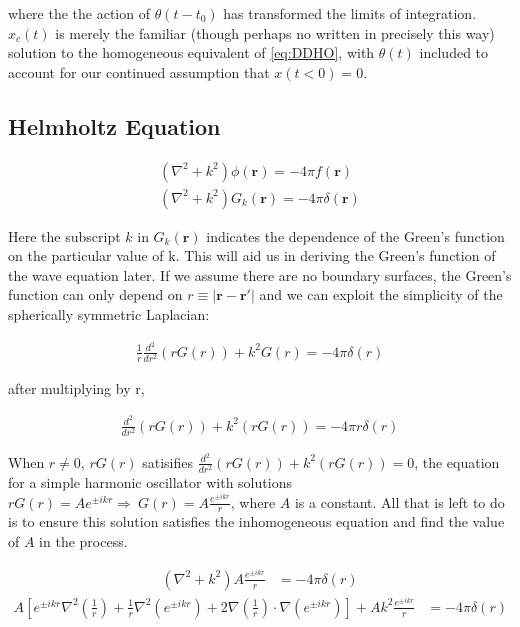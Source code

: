 \documentclass[11pt]{article}
\theoremstyle{plain}
\theoremstyle{definition}
\renewcommand{\vec}[1]{\mathbf{#1}} %
\begin{document}
where the the action of $\theta(t-t_0)$ has transformed the limits of integration. $x_c(t)$ is merely the familiar (though perhaps no written in precisely this way) solution to the homogeneous equivalent of \eqref{eq:DDHO}, with $\theta(t)$ included to account for our continued assumption that $x(t<0) = 0$.



\subsection{Helmholtz Equation}

\begin{align}
\left( \nabla^2+k^2 \right)\phi(\vec r) = -4\pi f(\vec r) \\
\left( \nabla^2+k^2 \right)G_k(\vec r) = -4\pi \delta(\vec r)
\end{align}

Here the subscript $k$ in $G_k(\vec r)$ indicates the dependence  of the Green's function on the particular value of k. This will aid us in deriving the Green's function of the wave equation later. If we assume there are no boundary surfaces, the Green's function can only depend on $r \equiv |\vec r - \vec r'|$ and we can exploit the simplicity of the spherically symmetric Laplacian:

\begin{align}
    \frac{1}{r} \frac{d^2}{dr^2} \left( rG(r) \right) + k^2 G(r) = -4\pi \delta(r)
\end{align}

after multiplying by r,

\begin{align}
    \frac{d^2}{dr^2} \left( rG(r) \right) + k^2 \left( rG(r)  \right) = -4\pi r \delta(r)
\end{align}

When $r \neq 0$, $rG(r)$ satisifies $ \frac{d^2}{dr^2} \left( rG(r) \right) + k^2 \left( rG(r)  \right) = 0$, the equation for a simple harmonic oscillator with solutions $rG(r) = A e^{\pm ikr} \Rightarrow \ G(r) = A \frac{e^{\pm ikr}}{r}$, where $A$ is a constant.  All that is left to do is to ensure this solution satisfies the inhomogeneous equation and find the value of $A$ in the process.

\begin{align}
    \left( \nabla^2+k^2 \right) A \frac{e^{\pm ikr}}{r} &= -4\pi \delta(r)
\end{align}
\begin{align}
    A \left[ e^{\pm ikr} \nabla^2 \left(\frac{1}{r}\right) + \frac{1}{r} \nabla^2 \left( e^{\pm ikr}  \right) + 2 \nabla \left( \frac{1}{r} \right) \cdot \nabla \left( e^{\pm ikr} \right) \right] + A k^2 \frac{e^{\pm ikr}}{r} &= -4\pi \delta(r)
\end{align}
\end{document}
